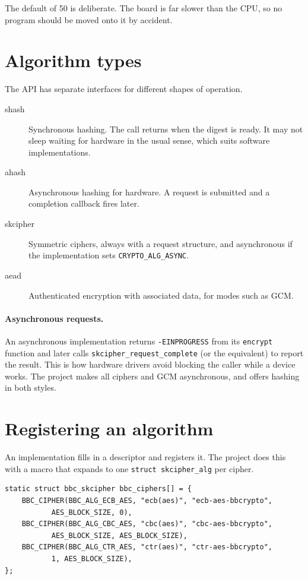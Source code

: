 \documentclass[11pt,a4paper,oneside]{report}
\newcommand{\code}[1]{\texttt{\small #1}}
\begin{document}
The default of 50 is deliberate. The board is far slower than the CPU, so no program should be moved onto it by accident.

\section{Algorithm types}

The API has separate interfaces for different shapes of operation.

\begin{description}
  \item[shash] Synchronous hashing. The call returns when the digest is ready. It may not sleep waiting for hardware in the usual sense, which suits software implementations.
  \item[ahash] Asynchronous hashing for hardware. A request is submitted and a completion callback fires later.
  \item[skcipher] Symmetric ciphers, always with a request structure, and asynchronous if the implementation sets \code{CRYPTO\_ALG\_ASYNC}.
  \item[aead] Authenticated encryption with associated data, for modes such as GCM.
\end{description}

\paragraph{Asynchronous requests.} An asynchronous implementation returns \code{-EINPROGRESS} from its \code{encrypt} function and later calls \code{skcipher\_request\_complete} (or the equivalent) to report the result. This is how hardware drivers avoid blocking the caller while a device works. The project makes all ciphers and GCM asynchronous, and offers hashing in both styles.

\section{Registering an algorithm}

An implementation fills in a descriptor and registers it. The project does this with a macro that expands to one \code{struct skcipher\_alg} per cipher.

\begin{lstlisting}
static struct bbc_skcipher bbc_ciphers[] = {
	BBC_CIPHER(BBC_ALG_ECB_AES, "ecb(aes)", "ecb-aes-bbcrypto",
		   AES_BLOCK_SIZE, 0),
	BBC_CIPHER(BBC_ALG_CBC_AES, "cbc(aes)", "cbc-aes-bbcrypto",
		   AES_BLOCK_SIZE, AES_BLOCK_SIZE),
	BBC_CIPHER(BBC_ALG_CTR_AES, "ctr(aes)", "ctr-aes-bbcrypto",
		   1, AES_BLOCK_SIZE),
};
\end{lstlisting}
\end{document}
